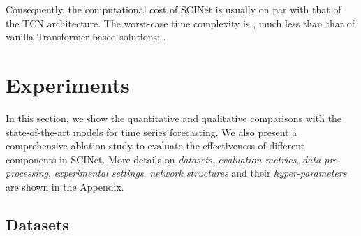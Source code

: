 \documentclass{article}
\newcommand{\red}[1]{\textcolor{red}{#1}}
\begin{document}
Consequently, the computational cost of SCINet is usually on par with that of the TCN architecture. The worst-case time complexity is , much less than that of vanilla Transformer-based solutions: .



\iffalse
\subsection{Overlap-FC}

\red{Instead of using single layer of simple fully connected layer as decoder, we designed an over-lapped fully connected layer as our decoder, as shown in fig.xx. Comparing with the original FC layer, our over-lapped FC layer can bring xx\% of performance boost.
}
\fi





\section{Experiments}
\label{sec:exp}

In this section, we show the quantitative and qualitative comparisons with the state-of-the-art models for time series forecasting. We also present a comprehensive ablation study to evaluate the effectiveness of different components in SCINet. More details on \emph{datasets}, \emph{evaluation metrics}, \emph{data pre-processing}, \emph{experimental settings}, \emph{network structures} and their \emph{hyper-parameters} are shown in the Appendix.

\iffalse
In Section~\ref{sec:datasets}, we first briefly introduce the  datasets on which we train the model and make comparisons with other models. 
In Section~\ref{sec:comparison_sota}, we show the quantitative and qualitative comparisons with the state-of-the-arts, and analyze the predictability of our method. 
Finally, a comprehensive ablation study is conducted in Section~\ref{sec:ab} to assess the effectiveness of different components. More details on \emph{datasets}, \emph{evaluation metrics}, \emph{data pre-processing}, \emph{experimental settings} and \emph{network structure  hyper-parameter tuning} are shown in the Appendix. \fi



\subsection{Datasets}
\label{sec:datasets}
\end{document}
